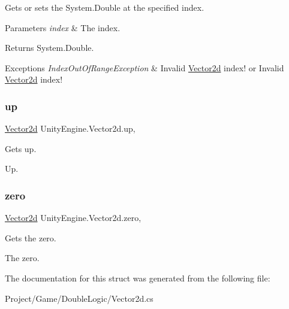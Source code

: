 Gets or sets the System.\+Double at the specified index. 


\begin{DoxyParams}{Parameters}
{\em index} & The index.\\
\hline
\end{DoxyParams}
\begin{DoxyReturn}{Returns}
System.\+Double.
\end{DoxyReturn}

\begin{DoxyExceptions}{Exceptions}
{\em Index\+Out\+Of\+Range\+Exception} & Invalid \hyperlink{struct_unity_engine_1_1_vector2d}{Vector2d} index! or Invalid \hyperlink{struct_unity_engine_1_1_vector2d}{Vector2d} index! \\
\hline
\end{DoxyExceptions}
\mbox{\label{struct_unity_engine_1_1_vector2d_a00ee365d7d1fff1d5be6586136a56950}} 
\subsubsection{\texorpdfstring{up}{up}}
{\footnotesize\ttfamily \hyperlink{struct_unity_engine_1_1_vector2d}{Vector2d} Unity\+Engine.\+Vector2d.\+up\hspace{0.3cm}{\ttfamily [static]}, {\ttfamily [get]}}



Gets up. 

Up.\mbox{\label{struct_unity_engine_1_1_vector2d_a57cc55a0bda185d893c26e8645c17fe4}} 
\subsubsection{\texorpdfstring{zero}{zero}}
{\footnotesize\ttfamily \hyperlink{struct_unity_engine_1_1_vector2d}{Vector2d} Unity\+Engine.\+Vector2d.\+zero\hspace{0.3cm}{\ttfamily [static]}, {\ttfamily [get]}}



Gets the zero. 

The zero.

The documentation for this struct was generated from the following file\+:\begin{DoxyCompactItemize}
\item 
Project/\+Game/\+Double\+Logic/Vector2d.\+cs\end{DoxyCompactItemize}
